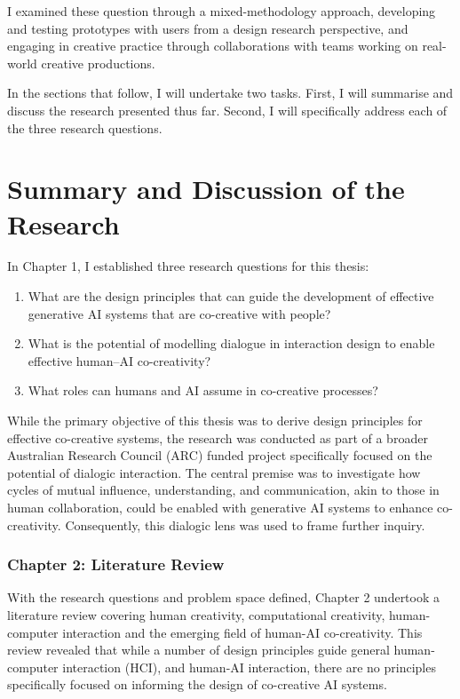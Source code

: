 I examined these question through a mixed-methodology approach, developing and testing prototypes with users from a design research perspective, and engaging in creative practice through collaborations with teams working on real-world creative productions.

In the sections that follow, I will undertake two tasks. First, I will summarise and discuss the research presented thus far. Second, I will specifically address each of the three research questions.  

\section{Summary and Discussion of the Research}

In Chapter 1, I established three research questions for this thesis:

\begin{enumerate}
    \item What are the design principles that can guide the development of effective generative AI systems that are co-creative with people?
    \item What is the potential of modelling dialogue in interaction design to enable effective human–AI co-creativity?
    \item What roles can humans and AI assume in co-creative processes?
\end{enumerate}

While the primary objective of this thesis was to derive design principles for effective co-creative systems, the research was conducted as part of a broader Australian Research Council (ARC) funded project specifically focused on the potential of dialogic interaction. The central premise was to investigate how cycles of mutual influence, understanding, and communication, akin to those in human collaboration, could be enabled with generative AI systems to enhance co-creativity. Consequently, this dialogic lens was used to frame further inquiry.

\subsubsection{\textbf{Chapter 2: Literature Review}}

With the research questions and problem space defined, Chapter 2 undertook a literature review covering human creativity, computational creativity, human-computer interaction and the emerging field of human-AI co-creativity. This review revealed that while a number of design principles guide general human-computer interaction (HCI), and human-AI interaction, there are no principles specifically focused on informing the design of co-creative AI systems.

